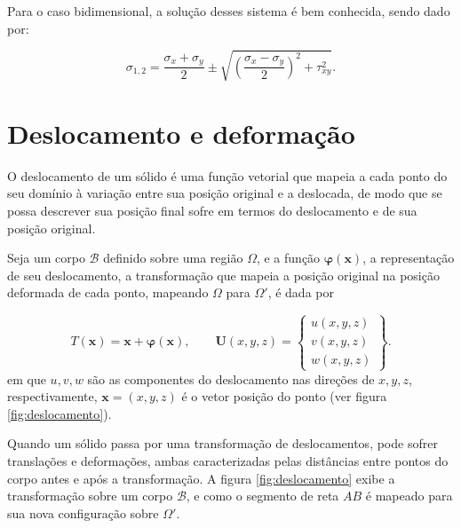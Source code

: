 Para o caso bidimensional, a solução desses sistema é bem conhecida, sendo dado por:

\begin{equation}
    \sigma_{1,2} = \frac{\sigma_x + \sigma_y}{2} \pm \sqrt{\left(\frac{\sigma_x - \sigma_y}{2}\right)^2 + \tau_{xy}^2}.
\end{equation}

\section{Deslocamento e deformação}

O deslocamento de um sólido é uma função vetorial que mapeia a cada ponto do seu domínio à variação entre sua posição original e a deslocada, de modo que se possa descrever sua posição final sofre em termos do deslocamento e de sua posição original. 

Seja um corpo $\mathcal{B}$ definido sobre uma região $\Omega$, e a função $\bm{\varphi}(\bm{x})$, a representação de seu deslocamento, a transformação que mapeia a posição original na posição deformada de cada ponto, mapeando $\Omega$ para $\Omega'$, é dada por

\begin{equation}
    T(\bm{x}) = \bm{x} + \bm{\varphi}(\bm{x}), \qquad
    \bm{U}(x,y,z) = \begin{Bmatrix}
        u(x,y,z) \\ v(x,y,z) \\ w(x,y,z) 
    \end{Bmatrix}.
    \label{eq:transformacao}
\end{equation}
em que $u, v, w$ são as componentes do deslocamento nas direções de $x, y, z$, respectivamente,  $\bm{x} = (x,y,z)$ é o vetor posição do ponto (ver figura \ref{fig:deslocamento}).



Quando um sólido passa por uma transformação de deslocamentos, pode sofrer translações e deformações, ambas caracterizadas pelas distâncias entre pontos do corpo antes e após a transformação. A figura \ref{fig:deslocamento} exibe a transformação sobre um corpo $\mathcal{B}$, e como o segmento de reta $AB$ é mapeado para sua nova configuração sobre $\Omega'$.

